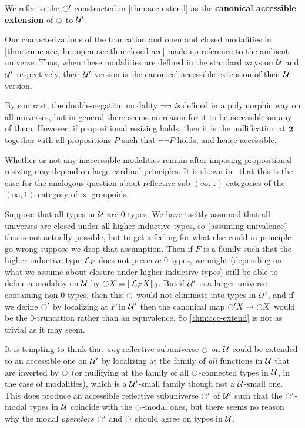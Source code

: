 We refer to the $\modal'$ constructed in \cref{thm:acc-extend} as the \textbf{canonical accessible extension} of $\modal$ to $\UU'$.

\begin{egs}
  Our characterizations of the truncation and open and closed modalities in \cref{thm:trunc-acc,thm:open-acc,thm:closed-acc} made no reference to the ambient universe.
  Thus, when these modalities are defined in the standard ways on $\UU$ and $\UU'$ respectively, their $\UU'$-version is the canonical accessible extension of their $\UU$-version.
\end{egs}

\begin{eg}
  By contrast, the double-negation modality $\neg\neg$ \emph{is} defined in a polymorphic way on all universes, but in general there seems no reason for it to be accessible on any of them.
  However, if propositional resizing holds, then it is the nullification at $\bool$ together with all propositions $P$ such that $\neg\neg P$ holds, and hence accessible.

  Whether or not any inaccessible modalities remain after imposing propositional resizing may depend on large-cardinal principles.
  It is shown in~\cite{css:large-cardinal} that this is the case for the analogous question about reflective sub-$(\infty,1)$-categories of the $(\infty,1)$-category of $\infty$-groupoids.
\end{eg}

\begin{eg}
  Suppose that all types in $\UU$ are 0-types.
  We have tacitly assumed that all universes are closed under all higher inductive types, so (assuming univalence) this is not actually possible, but to get a feeling for what else could in principle go wrong suppose we drop that assumption.
  Then if $F$ is a family such that the higher inductive type $\localization{F}$ does not preserve 0-types, we might (depending on what we assume about closure under higher inductive types) still be able to define a modality on $\UU$ by $\modal X = \trunc0{\localization{F}X}$.
  But if $\UU'$ is a larger universe containing non-0-types, then this $\modal$ would not eliminate into types in $\UU'$, and if we define $\modal'$ by localizing at $F$ in $\UU'$ then the canonical map $\modal' X \to \modal X$ would be the 0-truncation rather than an equivalence.
  So \cref{thm:acc-extend} is not as trivial as it may seem.
\end{eg}

\begin{rmk}\label{rmk:extend-oops}
  It is tempting to think that \emph{any} reflective subuniverse $\modal$ on $\UU$ could be extended to an accessible one on $\UU'$ by localizing at the family of \emph{all} functions in $\UU$ that are inverted by $\modal$ (or nullifying at the family of all $\modal$-connected types in $\UU$, in the case of modalities), which is a $\UU'$-small family though not a $\UU$-small one.
  This does produce an accessible reflective subuniverse $\modal'$ of $\UU'$ such that the $\modal'$-modal types in $\UU$ coincide with the $\modal$-modal ones, but there seems no reason why the modal \emph{operators} $\modal'$ and $\modal$ should agree on types in $\UU$.
\end{rmk}

